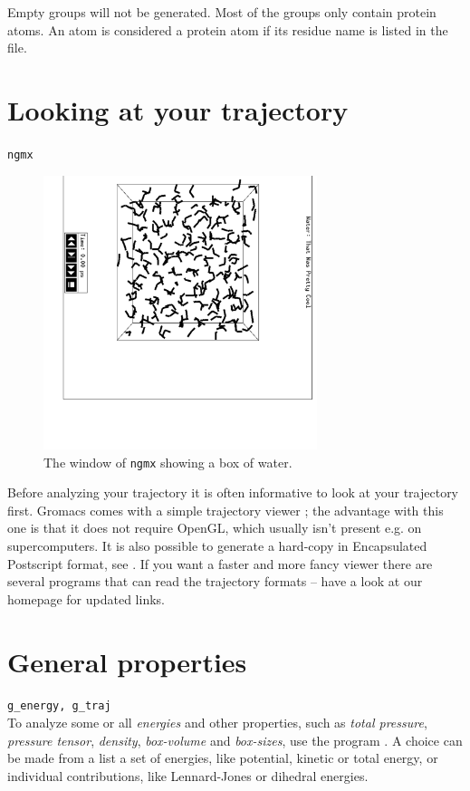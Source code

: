 Empty groups will not be generated.
Most of the groups only contain protein atoms.
An atom is considered a protein atom if its residue name is listed
in the {\tt {}} file.


\section{Looking at your trajectory}
\label{sec:lookwhostalking}
{\tt ngmx}\\
\begin{figure}
\centerline{
{\includegraphics[width=8cm,angle=90]{plots/ngmxdump}}}
\caption{The window of {\tt ngmx} showing a box of water.}
\label{fig:ngmxdump}
\end{figure}

Before analyzing your trajectory it is often informative to look at
your trajectory first. Gromacs comes with a simple trajectory
viewer {\tt {}}; the advantage with this one is that it does not
require OpenGL, which usually isn't present e.g. on supercomputers.
It is also possible to generate a
hard-copy in Encapsulated Postscript format, see
. If you want a faster and more fancy viewer
 there are several programs
that can read the {\gromacs} trajectory formats -- have a look at our
homepage {\wwwpage} for updated links. 


\section{General properties}
\label{sec:genprop}
{\tt g\_energy, g\_traj}\\
To analyze some or all {\em energies} and other properties, such as
{\em total pressure}, {\em pressure tensor}, {\em density}, {\em
box-volume} and {\em box-sizes}, use the program {\tt {}}.  A
choice can be made from a list a set of energies, like potential,
kinetic or total energy, or individual contributions, like
Lennard-Jones or dihedral energies.

